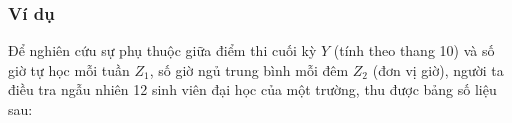 \begin{frame}
\frametitle{Ví dụ}

Để nghiên cứu sự phụ thuộc giữa điểm thi cuối kỳ $Y$ (tính theo thang 10) và số giờ tự học mỗi tuần $Z_1$, số giờ ngủ trung bình mỗi đêm $Z_2$ (đơn vị giờ), người ta điều tra ngẫu nhiên 12 sinh viên đại học của một trường, thu được bảng số liệu sau:


\end{frame}

